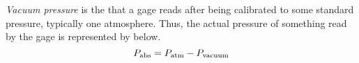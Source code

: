 \begin{definition}\label{def:Vacuum_Pressure}
  \emph{Vacuum pressure} is the  that a gage reads after being calibrated to some standard pressure, typically one atmosphere.
  Thus, the actual pressure of something read by the gage is represented by  below.
  \begin{equation}\label{eq:Vacuum_Pressure}
    P_{\mathrm{abs}} = P_{\mathrm{atm}} - P_{\mathrm{vacuum}}
  \end{equation}
\end{definition}



